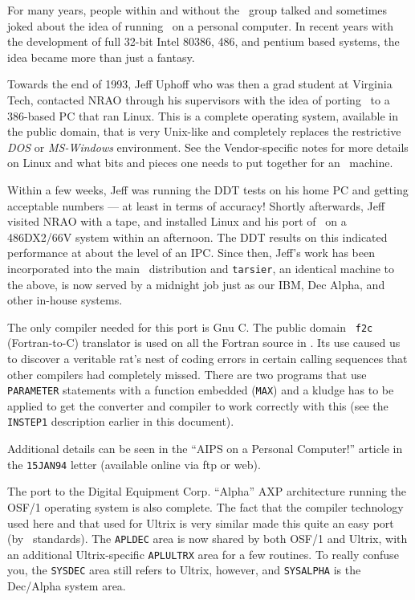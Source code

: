 
For many years, people within and without the \AIPS\ group talked and
sometimes joked about the idea of running \AIPS\ on a personal computer.
In recent years with the development of full 32-bit Intel 80386, 486, and
pentium based systems, the idea became more than just a fantasy.

Towards the end of 1993, Jeff Uphoff who was then a grad student at
Virginia Tech, contacted NRAO through his supervisors with the idea of
porting \AIPS\ to a 386-based PC that ran Linux.  This is a complete
operating system, available in the public domain, that is very Unix-like
and completely replaces the restrictive {\it DOS\/} or {\it MS-Windows\/}
environment.  See the Vendor-specific notes for more details on Linux and
what bits and pieces one needs to put together for an \AIPS\ machine.

Within a few weeks, Jeff was running the DDT tests on his home PC and
getting acceptable numbers --- at least in terms of accuracy!  Shortly
afterwards, Jeff visited NRAO with a tape, and installed Linux and his
port of \AIPS\ on a 486DX2/66V system within an afternoon.  The DDT
results on this indicated performance at about the level of an IPC.  Since
then, Jeff's work has been incorporated into the main \AIPS\ distribution
and {\tt tarsier}, an identical machine to the above, is now served by a
midnight job just as our IBM, Dec Alpha, and other in-house systems.

The only compiler needed for this port is Gnu C.  The public domain {\tt
f2c} (Fortran-to-C) translator is used on all the Fortran source in \AIPS.
Its use caused us to discover a veritable rat's nest of coding errors in
certain calling sequences that other compilers had completely missed.
There are two programs that use {\tt PARAMETER} statements with a function
embedded ({\tt MAX}) and a kludge has to be applied to get the converter
and compiler to work correctly with this (see the {\tt INSTEP1}
description earlier in this document).

Additional details can be seen in the ``AIPS on a Personal Computer!''
article in the {\tt 15JAN94} \AIPS letter (available online via ftp or
web).


The port to the Digital Equipment Corp. ``Alpha'' AXP architecture running
the OSF/1 operating system is also complete.  The fact that the compiler
technology used here and that used for Ultrix is very similar made this
quite an easy port (by \AIPS\ standards).  The {\tt \dol APLDEC} area is now
shared by both OSF/1 and Ultrix, with an additional Ultrix-specific
{\tt\dol APLULTRX} area for a few routines.  To really confuse you, the
{\tt\dol SYSDEC} area still refers to Ultrix, however, and {\tt\dol SYSALPHA} is
the Dec/Alpha system area.

